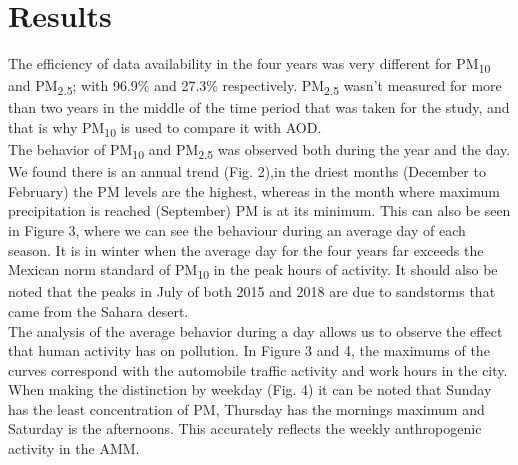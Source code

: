 \section{Results}
The efficiency of data availability in the four years was very different for PM\textsubscript{10} and PM\textsubscript{2.5}; with 96.9\% and 27.3\% respectively. PM\textsubscript{2.5} wasn’t measured for more than two years in the middle of the time period that was taken for the study, and that is why PM\textsubscript{10} is used to compare it with AOD.\\

The behavior of PM\textsubscript{10} and PM\textsubscript{2.5} was observed both during the year and the day. We found  there is an annual trend (Fig. 2),in the driest months (December to February) the PM levels are the highest, whereas in the month where maximum precipitation is reached (September) PM is at its minimum. This can also be seen in Figure 3, where we can see the behaviour during an average day of each season. It is in winter when the average day for the four years far exceeds the Mexican norm standard of PM\textsubscript{10} in the peak hours of activity. It should also be noted that the peaks in July of both 2015 and 2018 are due to sandstorms that came from the Sahara desert.\\

The analysis of the average behavior during a day allows us to observe the effect that human activity has on pollution. In Figure 3 and 4, the maximums of the curves correspond with the automobile traffic activity and work hours in the city. When making the distinction by weekday (Fig. 4) it can be noted that Sunday has the least concentration of PM, Thursday has the mornings maximum and Saturday is the afternoons. This accurately reflects the weekly anthropogenic activity in the AMM.